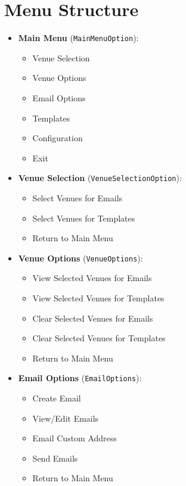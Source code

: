 \documentclass{article}
\begin{document}
	\section{Menu Structure}
	
	\begin{itemize}
		\item \textbf{Main Menu} (\texttt{MainMenuOption}):
		\begin{itemize}
			\item Venue Selection
			\item Venue Options
			\item Email Options
			\item Templates
			\item Configuration
			\item Exit
		\end{itemize}
		
		\item \textbf{Venue Selection} (\texttt{VenueSelectionOption}):
		\begin{itemize}
			\item Select Venues for Emails
			\item Select Venues for Templates
			\item Return to Main Menu
		\end{itemize}
		
		\item \textbf{Venue Options} (\texttt{VenueOptions}):
		\begin{itemize}
			\item View Selected Venues for Emails
			\item View Selected Venues for Templates
			\item Clear Selected Venues for Emails
			\item Clear Selected Venues for Templates
			\item Return to Main Menu
		\end{itemize}
		
		\item \textbf{Email Options} (\texttt{EmailOptions}):
		\begin{itemize}
			\item Create Email
			\item View/Edit Emails
			\item Email Custom Address
			\item Send Emails
			\item Return to Main Menu
		\end{itemize}
		

\end{itemize}
\end{document}
